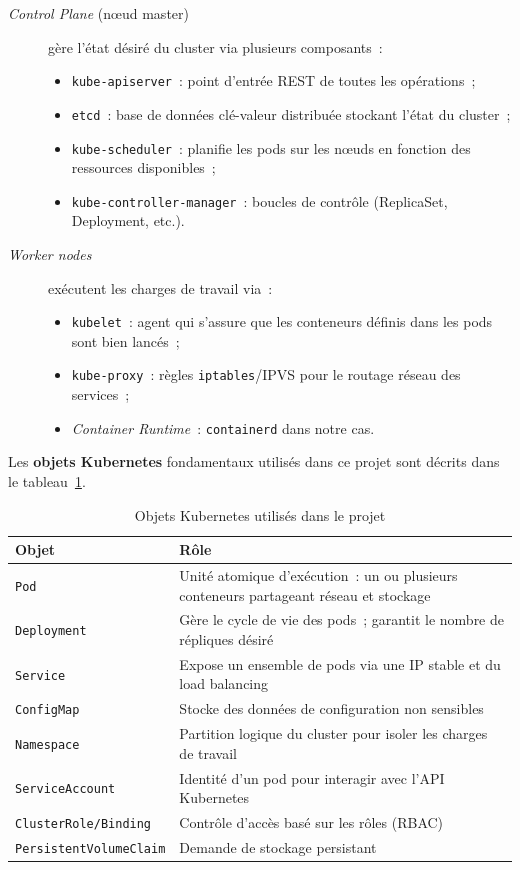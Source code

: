 \documentclass[12pt,a4paper,french]{report}
\newcommand{\cmd}[1]{\texttt{\small\color{keywordcolor}#1}}
\newcommand{\kw}[1]{\textbf{#1}}
\begin{document}
\begin{description}
  \item[\emph{Control Plane} (nœud master)] gère l'état désiré du cluster via plusieurs composants~:
    \begin{itemize}
      \item \cmd{kube-apiserver}~: point d'entrée REST de toutes les opérations~;
      \item \cmd{etcd}~: base de données clé-valeur distribuée stockant l'état du cluster~;
      \item \cmd{kube-scheduler}~: planifie les pods sur les nœuds en fonction des ressources disponibles~;
      \item \cmd{kube-controller-manager}~: boucles de contrôle (ReplicaSet, Deployment, etc.).
    \end{itemize}
  
  \item[\emph{Worker nodes}] exécutent les charges de travail via~:
    \begin{itemize}
      \item \cmd{kubelet}~: agent qui s'assure que les conteneurs définis dans les pods sont bien lancés~;
      \item \cmd{kube-proxy}~: règles \texttt{iptables}/IPVS pour le routage réseau des services~;
      \item \emph{Container Runtime}~: \cmd{containerd} dans notre cas.
    \end{itemize}
\end{description}

Les \kw{objets Kubernetes} fondamentaux utilisés dans ce projet sont décrits dans le tableau~\ref{tab:k8s-objects}.

\begin{table}[H]
\centering
\caption{Objets Kubernetes utilisés dans le projet}
\label{tab:k8s-objects}
\begin{tabularx}{\textwidth}{lX}
\toprule
\textbf{Objet} & \textbf{Rôle} \\
\midrule
\texttt{Pod} & Unité atomique d'exécution~: un ou plusieurs conteneurs partageant réseau et stockage \\
\texttt{Deployment} & Gère le cycle de vie des pods~; garantit le nombre de répliques désiré \\
\texttt{Service} & Expose un ensemble de pods via une IP stable et du load balancing \\
\texttt{ConfigMap} & Stocke des données de configuration non sensibles \\
\texttt{Namespace} & Partition logique du cluster pour isoler les charges de travail \\
\texttt{ServiceAccount} & Identité d'un pod pour interagir avec l'API Kubernetes \\
\texttt{ClusterRole/Binding} & Contrôle d'accès basé sur les rôles (RBAC) \\
\texttt{PersistentVolumeClaim} & Demande de stockage persistant \\
\bottomrule
\end{tabularx}
\end{table}
\end{document}
